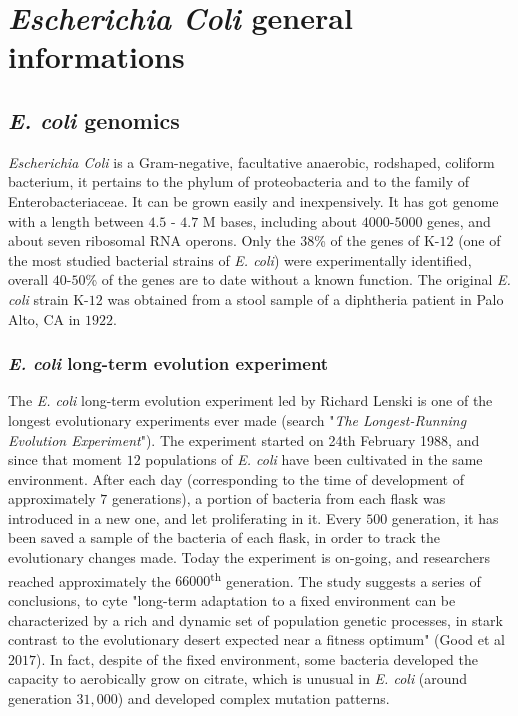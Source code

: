 \graphicspath{{chapters/images/01/}}

\chapter{\emph{Escherichia Coli} general informations}
\section{\emph{E. coli} genomics}
\emph{Escherichia Coli} is a Gram-negative, facultative anaerobic, rodshaped, coliform bacterium, it pertains to the phylum of proteobacteria and to the family of Enterobacteriaceae. It can be grown easily and inexpensively. It has got genome with a length between $4.5$ - $4.7$ M bases, including about $4000$-$5000$ genes, and about seven ribosomal RNA operons. Only the $38$\% of the genes of K-$12$ (one of the most studied bacterial strains of \emph{E. coli}) were experimentally identified, overall $40$-$50$\% of the genes are to date without a known function.
The original \emph{E. coli} strain K-$12$ was obtained from a stool sample of a diphtheria patient in Palo Alto, CA in $1922$.

\subsection{\emph{E. coli} long-term evolution experiment}
The \emph{E. coli} long-term evolution experiment led by Richard Lenski is one of the longest evolutionary experiments ever made (search "\textit{The Longest-Running Evolution Experiment}"). The experiment started on 24th February 1988, and since that moment $12$ populations of \emph{E. coli} have been cultivated in the same environment. After each day (corresponding to the time of development of approximately $7$ generations), a portion of bacteria from each flask was introduced in a new one, and let proliferating in it. Every $500$ generation, it has been saved a sample of the bacteria of each flask, in order to track the evolutionary changes made. Today the experiment is on-going, and researchers reached approximately the $66000$\textsuperscript{th} generation. The study suggests a series of conclusions, to cyte "long-term adaptation to a fixed environment can be characterized by a rich and dynamic set of population genetic processes, in stark contrast to the evolutionary desert expected near a fitness optimum" (Good et al $2017$). In fact, despite of the fixed environment, some bacteria developed the capacity to aerobically grow on citrate, which is unusual in \emph{E. coli} (around generation $31,000$) and developed complex mutation patterns.

